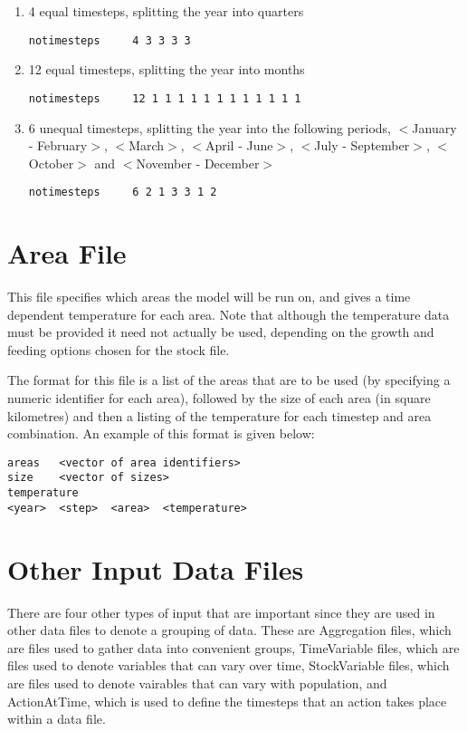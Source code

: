 \documentclass[10pt,twoside]{book}
\begin{document}
\begin{enumerate}
\item 4 equal timesteps, splitting the year into quarters
{\small\begin{verbatim}
notimesteps     4 3 3 3 3
\end{verbatim}}
\item 12 equal timesteps, splitting the year into months
{\small\begin{verbatim}
notimesteps     12 1 1 1 1 1 1 1 1 1 1 1 1
\end{verbatim}}
\item 6 unequal timesteps, splitting the year into the following periods, $<$January - February$>$, $<$March$>$, $<$April - June$>$, $<$July - September$>$, $<$October$>$ and $<$November - December$>$
{\small\begin{verbatim}
notimesteps     6 2 1 3 3 1 2
\end{verbatim}}
\end{enumerate}

\section{Area File}\label{sec:areafile}
This file specifies which areas the model will be run on, and gives a time dependent temperature for each area.  Note that although the temperature data must be provided it need not actually be used, depending on the growth and feeding options chosen for the stock file.

\bigskip
The format for this file is a list of the areas that are to be used (by specifying a numeric identifier for each area), followed by the size of each area (in square kilometres) and then a listing of the temperature for each timestep and area combination.  An example of this format is given below:

{\small\begin{verbatim}
areas   <vector of area identifiers>
size    <vector of sizes>
temperature
<year>  <step>  <area>  <temperature>
\end{verbatim}}

\section{Other Input Data Files}\label{sec:otherinputfile}
There are four other types of input that are important since they are used in other data files to denote a grouping of data.  These are Aggregation files, which are files used to gather data into convenient groups, TimeVariable files, which are files used to denote variables that can vary over time, StockVariable files, which are files used to denote vairables that can vary with population, and ActionAtTime, which is used to define the timesteps that an action takes place within a data file.
\end{document}

